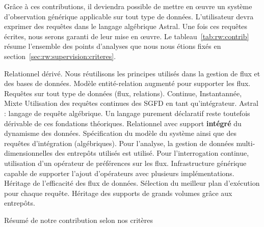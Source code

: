 Grâce à ces contributions, il deviendra possible de mettre en œuvre un système d'observation générique applicable sur tout type de données. L'utilisateur devra exprimer des requêtes dans le langage algébrique Astral. Une fois ces requêtes écrites, nous serons garanti de leur mise en œuvre. Le tableau~\ref{tab:rw:contrib} résume l'ensemble des points d'analyses que nous nous étions fixés en section~\ref{sec:rw:supervision:criteres}.
\begin{table}[!ht]
\criteretabDonnee
    {Relationnel dérivé. Nous réutilisons les principes utilisés dans la gestion de flux et des bases de données.}
    {\good Modèle entité-relation augmenté pour supporter les flux.}
    {\good Requêtes sur tout type de données (flux, relations).}
\criteretabTraitement
    {\good Continue, Instantannée, Mixte}
    {\good Utilisation des requêtes continues des SGFD en tant qu'intégrateur.}
    {\meh Astral : langage de requête algébrique. Un langage purement déclaratif reste toutefois dérivable de ces fondations théoriques.}
    {\good Relationnel avec support \textbf{intégré} du dynamisme des données.}
\criteretabAdaptabilite
    {\good Spécification du modèle du système ainsi que des requêtes d'intégration (algébriques).}
    {\meh Pour l'analyse, la gestion de données multi-dimensionnelles des entrepôts utilisés est utilisé. Pour l'interrogation continue, utilisation d'un opérateur de préférences sur les flux.}
    {\good Infrastructure générique capable de supporter l'ajout d'opérateurs avec plusieurs implémentations.}
    {\good Héritage de l'efficacité des flux de données. Sélection du meilleur plan d'exécution pour chaque requête. Héritage des supports de grands volumes grâce aux entrepôts.}
\caption{Résumé de notre contribution selon nos critères}\label{tab:rw:contrib}
\end{table}